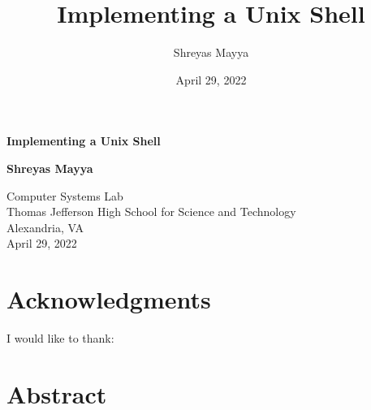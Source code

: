 \documentclass[12pt,twoside]{report} %
\title{Implementing a Unix Shell}
\author{Shreyas Mayya}
\date{April 29, 2022}
\begin{document}

%



	\begin{titlepage}
		\begin{center}
			\vspace*{1.75in}
			\Huge
			\textbf{Implementing a Unix Shell}
			\vspace{0.5in}

			\LARGE
			\textbf{Shreyas Mayya}
			\vspace{0.5in}

			\Large
			Computer Systems Lab\\
			Thomas Jefferson High School for Science and Technology\\
			Alexandria, VA\\
			April 29, 2022
		\end{center}
	\end{titlepage}


	\newcommand\blankpage{%
		\null
		\thispagestyle{empty}%
		\addtocounter{page}{-1}%
		\newpage}

	\afterpage{\blankpage{}}

	\chapter*{Acknowledgments}
	I would like to thank:
	
	\afterpage{\blankpage{}}

	\tableofcontents

	
	\chapter*{Abstract}
	
\end{document}
